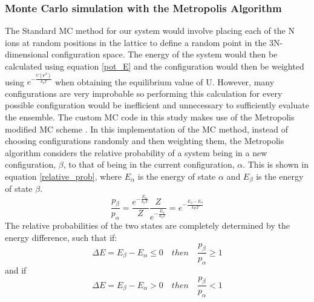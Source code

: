 \documentclass[11pt, twoside]{report}
\begin{document}
\subsubsection{Monte Carlo simulation with the Metropolis Algorithm }
The Standard MC method for our system would involve placing each of the N ions at random positions in the lattice to define a random point in the 3N-dimensional configuration space. The energy of the system would then be calculated using equation \ref{pot_E} and the configuration would then be weighted using $e^{-\frac{U(\mathbf{r}^N)}{k_bT}}$ when obtaining the equilibrium value of U. However, many configurations are very improbable so performing this calculation for every possible configuration would be inefficient and unnecessary to sufficiently evaluate the ensemble. The custom MC code in this study makes use of the Metropolis modified MC scheme \cite{Metropolis}. In this implementation of the MC method, instead of choosing configurations randomly and then weighting them, the Metropolis algorithm considers the relative probability of a system being in a new configuration, $\beta$, to that of being in the current configuration, $\alpha$. This is shown in equation \ref{relative_prob}, where $E_\alpha$ is the energy of state $\alpha$ and $E_\beta$ is the energy of state $\beta$.
\begin{equation}\label{relative_prob}
\frac{p_\beta}{p_\alpha} = \frac{  e^{-\frac{E_\alpha}{k_bT}} }{Z} \frac{Z}{  e^{-\frac{E_\alpha}{k_bT}} } = e^{- \frac{E_\beta - E_\alpha}{k_BT}}
\end{equation}
The relative probabilities of the two states are completely determined by the energy 
difference, such that if:
\begin{equation}\label{met}
\Delta E = E_{\beta} - E_{\alpha} \leq 0    \quad  then  \quad   \frac{p_{\beta}}{p_{\alpha}} \geq 1 
\end{equation}
and if
\begin{equation}\label{met2}
\Delta E = E_{\beta} - E_{\alpha} > 0   \quad   then   \quad   \frac{p_{\beta}}{p_{\alpha}} < 1
\end{equation}
\end{document}
